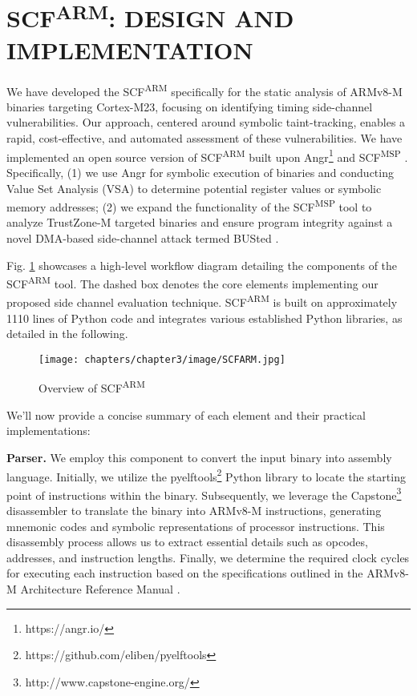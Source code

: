 \section{\gls{SCF}\textsuperscript{ARM}: DESIGN AND IMPLEMENTATION}

We have developed the \gls{SCF}\textsuperscript{ARM} specifically for the static analysis of ARMv8-M binaries targeting Cortex-M23, focusing on identifying timing side-channel vulnerabilities. Our approach, centered around symbolic taint-tracking, enables a rapid, cost-effective, and automated assessment of these vulnerabilities. We have implemented an open source  version of \gls{SCF}\textsuperscript{ARM} built upon Angr\footnote{https://angr.io/} and \gls{SCF}\textsuperscript{MSP} \cite{scfmsp}. Specifically, (1) we use Angr for symbolic execution of binaries and conducting Value Set Analysis (\gls{VSA}) to determine potential register values or symbolic memory addresses; (2) we expand the functionality of the \gls{SCF}\textsuperscript{MSP} tool to analyze TrustZone-M targeted binaries and ensure program integrity against a novel DMA-based side-channel attack termed BUSted \cite{busted}. 

Fig. \ref{fig:SCFARM} showcases a high-level workflow diagram detailing the components of the \gls{SCF}\textsuperscript{ARM} tool. The dashed box denotes the core elements implementing our proposed side channel evaluation technique. \gls{SCF}\textsuperscript{ARM} is built on approximately 1110 lines of Python code and integrates various established Python libraries, as detailed in the following.

\begin{figure}
  \centering
  \medskip
  \texttt{[image: chapters/chapter3/image/SCFARM.jpg]}
  \caption[Short caption for Table of Figures]{Overview of \gls{SCF}\textsuperscript{ARM}}
  \label{fig:SCFARM}
\end{figure}

We'll now provide a concise summary of each element and their practical implementations:

\textbf{Parser.} We employ this component to convert the input binary into assembly language. Initially, we utilize the pyelftools\footnote{https://github.com/eliben/pyelftools} Python library to locate the starting point of instructions within the binary. Subsequently, we leverage the Capstone\footnote{http://www.capstone-engine.org/} disassembler to translate the binary into ARMv8-M instructions, generating mnemonic codes and symbolic representations of processor instructions. This disassembly process allows us to extract essential details such as opcodes, addresses, and instruction lengths. Finally, we determine the required clock cycles for executing each instruction based on the specifications outlined in the ARMv8-M Architecture Reference Manual \cite{armv8m_ref_manual}.

